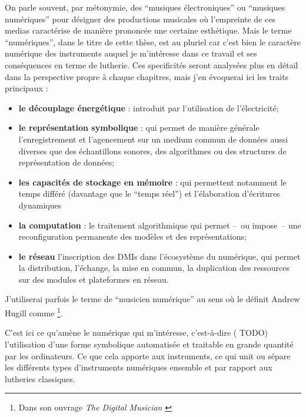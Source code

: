 \indent On parle souvent, par métonymie, des ``musiques électroniques'' ou ``musiques numériques'' pour désigner des productions musicales où l'empreinte de ces medias caractérise de manière prononcée une certaine esthétique. Mais le terme ``numériques'', dans le titre de cette thèse, est au pluriel car c'est bien le caractère numérique des instruments auquel je m'intéresse dans ce travail et ses conséquences en terme de lutherie. Ces specificités seront analysées plus en détail dans la perspective propre à chaque chapitres, mais j'en évoquerai ici les traits principaux :
\vspace{-1em}
\begin{itemize}[noitemsep]
\item \textbf{le découplage énergétique} : introduit par l'utilisation de l'électricité;
\item \textbf{le représentation symbolique} : qui permet de manière générale l'enregistrement et l'agencement sur un medium commun de données aussi diverses que des échantillons sonores, des algorithmes ou des structures de représentation de données;
\item \textbf{les capacités de stockage en mémoire} : qui permettent notamment le temps différé (davantage que le ``temps réel'') et l'élaboration d'écritures dynamiques 
\item \textbf{la computation} : le traitement algorithmique qui permet --~ou impose~-- une reconfiguration permanente des modèles et des représentations;
\item \textbf{le réseau} l'inscription des \glspl{DMI} dans l'écosystème du numérique, qui permet la distribution, l'échange, la mise en commun, la duplication des ressources sur des modules et plateformes en réseau.
\end{itemize}

J'utiliserai parfois le terme de ``musicien numérique'' au sens où le définit Andrew Hugill comme \footnote{Dans son ouvrage \textit{The Digital Musician} \cite{hugill_digital_2019}}.

C'est ici ce qu'amène le numérique qui m'intéresse, c'est-à-dire ( TODO) l'utilisation d'une forme symbolique automatisée et traitable en grande quantité par les ordinateurs. Ce que cela apporte aux instruments, ce qui unit ou sépare les différents types d'instruments numériques ensemble et par rapport aux lutheries classiques.


